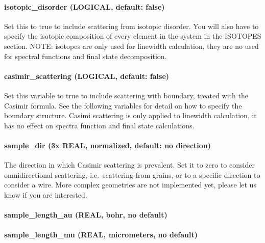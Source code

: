 \documentclass[
]{article}
\begin{document}
\hypertarget{isotopic_disorder-logical-default-false}{%
\paragraph{isotopic\_disorder (LOGICAL, default:
false)}\label{isotopic_disorder-logical-default-false}}

Set this to true to include scattering from isotopic disorder. You will
also have to specify the isotopic composition of every element in the
system in the ISOTOPES section. NOTE: isotopes are only used for
linewidth calculation, they are no used for spectral functions and final
state decomposition.

\hypertarget{casimir_scattering-logical-default-false}{%
\paragraph{casimir\_scattering (LOGICAL, default:
false)}\label{casimir_scattering-logical-default-false}}

Set this variable to true to include scattering with boundary, treated
with the Casimir formula. See the following variables for detail on how
to specify the boundary structure. Casimi scattering is only applied to
linewidth calculation, it has no effect on spectra function and final
state calculations.

\hypertarget{sample_dir-3x-real-normalized-default-no-direction}{%
\paragraph{sample\_dir (3x REAL, normalized, default: no
direction)}\label{sample_dir-3x-real-normalized-default-no-direction}}

The direction in which Casimir scattering is prevalent. Set it to zero
to consider omnidirectional scattering, i.e.~scattering from grains, or
to a specific direction to consider a wire. More complex geometries are
not implemented yet, please let us know if you are interested.

\hypertarget{sample_length_au-real-bohr-no-default}{%
\paragraph{sample\_length\_au (REAL, bohr, no
default)}\label{sample_length_au-real-bohr-no-default}}

\hypertarget{sample_length_mu-real-micrometers-no-default}{%
\paragraph{sample\_length\_mu (REAL, micrometers, no
default)}\label{sample_length_mu-real-micrometers-no-default}}
\end{document}
